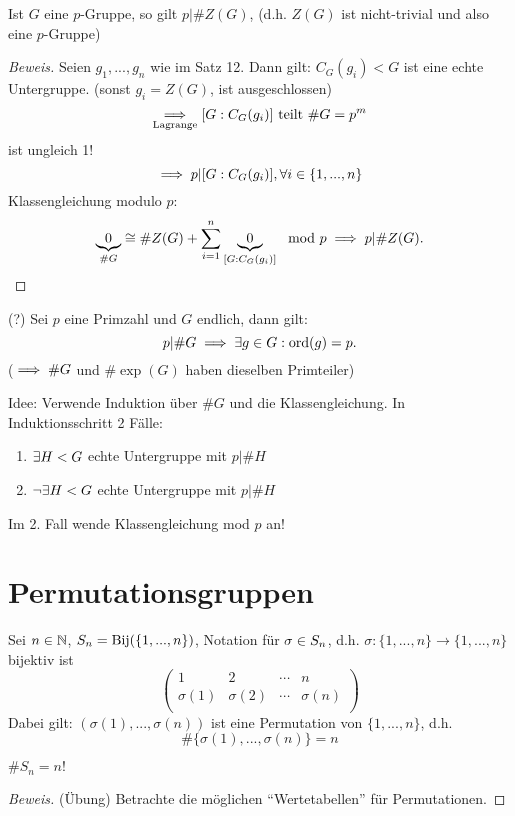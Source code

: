 \documentclass[a4paper]{report}
\begin{document}
\begin{kor}
  Ist $G$ eine $p$-Gruppe, so gilt $p | \#Z(G)$, (d.h. $Z(G)$ ist nicht-trivial und also eine $p$-Gruppe)
\end{kor}

\begin{proof}[Beweis]
  Seien $g_{1}, ..., g_{n}$ wie im Satz 12. Dann gilt: $C_{G}(g_{i}) < G$ ist eine echte Untergruppe. (sonst $g_{i} = Z(G)$, ist ausgeschlossen)
  \[\underset{\text{Lagrange}}{\implies} [G: C_{G}(g_{i})] \text{ teilt } \# G = p^{m}\]
  ist ungleich 1!
  \[ \implies p | [G: C_{G}(g_{i})], \forall i \in \{1, ..., n\}\]
  Klassengleichung modulo $p:$
  \[\underbrace 0_{\# G} \cong \# Z(G) + \sum_{i=1}^n \underbrace 0_{[G : C_{G}(g_{i})]} \mod p \implies p | \# Z(G). \qedhere\]
\end{proof}

\begin{ubng}(?) Sei $p$ eine Primzahl und $G$ endlich, dann gilt:
  \[p | \#G \implies \exists g \in G : \operatorname{ord}(g) = p.\]
  ($\implies \#G$ und $\#\exp(G)$ haben dieselben Primteiler)

  Idee: Verwende Induktion über $\#G$ und die Klassengleichung. In Induktionsschritt 2 Fälle:
  \begin{enumerate}
\item $\exists H < G$ echte Untergruppe mit $p | \#H$
\item $\neg \exists H < G$ echte Untergruppe mit $p | \#H$
  \end{enumerate}
  Im 2. Fall wende Klassengleichung mod $p$ an!
\end{ubng}

\section{Permutationsgruppen}
Sei $n \in \mathbb{N}$, $S_n = \operatorname{Bij}(\{1, ..., n\})$, Notation für $\sigma \in S_n$, d.h. $\sigma : \{1, ..., n\} \to\{1, ..., n\}$ bijektiv ist
\[\begin{pmatrix}
1 & 2 & \cdots & n \\
\sigma(1) & \sigma(2) & \cdots & \sigma(n) \\
  \end{pmatrix}\]
Dabei gilt: $(\sigma(1), ..., \sigma(n))$ ist eine Permutation von $\{1, ..., n\}$, d.h. \[\#\{\sigma(1), ..., \sigma(n)\} = n\]

\begin{kor}
  $\#S_{n} = n!$
\end{kor}
\begin{proof}[Beweis](Übung) Betrachte die möglichen ``Wertetabellen'' für Permutationen.
\end{proof}
\end{document}
